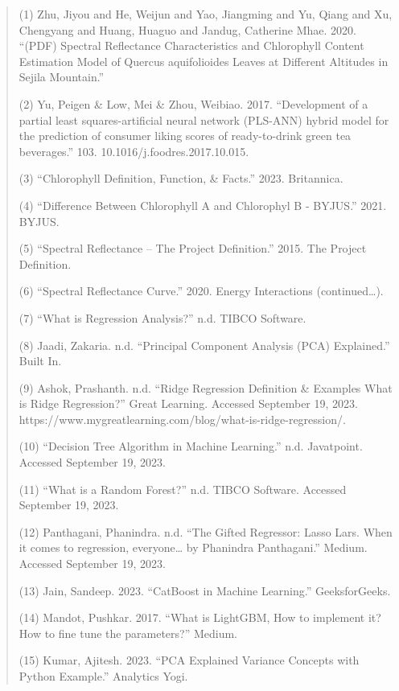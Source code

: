 \documentclass[
]{article}
\begin{document}
\begin{quote}
(1) Zhu, Jiyou and He, Weijun and Yao, Jiangming and Yu, Qiang and Xu,
Chengyang and Huang, Huaguo and Jandug, Catherine Mhae. 2020. ``(PDF)
Spectral Reflectance Characteristics and Chlorophyll Content Estimation
Model of Quercus aquifolioides Leaves at Different Altitudes in Sejila
Mountain.''

(2) Yu, Peigen \& Low, Mei \& Zhou, Weibiao. 2017. ``Development of a
partial least squares-artificial neural network (PLS-ANN) hybrid model
for the prediction of consumer liking scores of ready-to-drink green tea
beverages.'' 103. 10.1016/j.foodres.2017.10.015.

(3) ``Chlorophyll \textbar{} Definition, Function, \& Facts.'' 2023.
Britannica.

(4) ``Difference Between Chlorophyll A and Chlorophyl B -
BYJU\textquotesingle S.'' 2021. BYJU\textquotesingle S.

(5) ``Spectral Reflectance -- The Project Definition.'' 2015. The
Project Definition.

(6) ``Spectral Reflectance Curve.'' 2020. Energy Interactions
(continued\ldots).

(7) ``What is Regression Analysis?'' n.d. TIBCO Software.

(8) Jaadi, Zakaria. n.d. ``Principal Component Analysis (PCA)
Explained.'' Built In.

(9) Ashok, Prashanth. n.d. ``Ridge Regression Definition \& Examples
\textbar{} What is Ridge Regression?'' Great Learning. Accessed
September 19, 2023.
https://www.mygreatlearning.com/blog/what-is-ridge-regression/.

(10) ``Decision Tree Algorithm in Machine Learning.'' n.d. Javatpoint.
Accessed September 19, 2023.

(11) ``What is a Random Forest?'' n.d. TIBCO Software. Accessed
September 19, 2023.

(12) Panthagani, Phanindra. n.d. ``The Gifted Regressor: Lasso Lars.
When it comes to regression, everyone\ldots{} \textbar{} by Phanindra
Panthagani.'' Medium. Accessed September 19, 2023.

(13) Jain, Sandeep. 2023. ``CatBoost in Machine Learning.''
GeeksforGeeks.

(14) Mandot, Pushkar. 2017. ``What is LightGBM, How to implement it? How
to fine tune the parameters?'' Medium.

(15) Kumar, Ajitesh. 2023. ``PCA Explained Variance Concepts with Python
Example.'' Analytics Yogi.


\end{quote}
\end{document}
